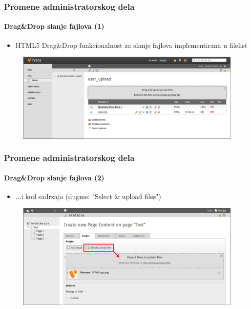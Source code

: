 
\begin{frame}[fragile]
	\frametitle{Promene administratorskog dela}
	\framesubtitle{Drag\&Drop slanje fajlova (1)}

	\begin{itemize}
		\item HTML5 Drag\&Drop funkcionalnost za slanje fajlova implementirana u filelist

	\end{itemize}

	\begin{figure}
		\includegraphics[width=0.95\linewidth]{Images/BackendChanges/DragDropFileUpload.png}
	\end{figure}

\end{frame}


\begin{frame}[fragile]
	\frametitle{Promene administratorskog dela}
	\framesubtitle{Drag\&Drop slanje fajlova (2)}

	\begin{itemize}
		\item ...i kod sadrzaja (dugme: "Select \& upload files")

	\end{itemize}

	\begin{figure}
		\includegraphics[width=0.95\linewidth]{Images/BackendChanges/SelectAndUploadFiles.png}
	\end{figure}

\end{frame}

